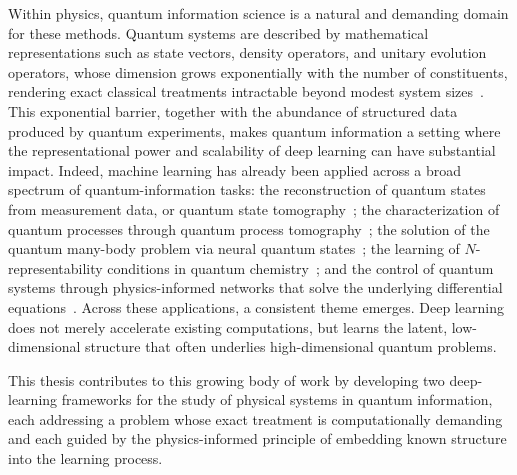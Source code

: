 Within physics, quantum information science is a natural and demanding domain for these methods. Quantum systems are described by mathematical representations such as state vectors, density operators, and unitary evolution operators, whose dimension grows exponentially with the number of constituents, rendering exact classical treatments intractable beyond modest system sizes~\cite{lloyd1996}. This exponential barrier, together with the abundance of structured data produced by quantum experiments, makes quantum information a setting where the representational power and scalability of deep learning can have substantial impact. Indeed, machine learning has already been applied across a broad spectrum of quantum-information tasks: the reconstruction of quantum states from measurement data, or quantum state tomography~\cite{carrasquilla_qst_2019, danaci2021}; the characterization of quantum processes through quantum process tomography~\cite{huang2025}; the solution of the quantum many-body problem via neural quantum states~\cite{carleo2017, carleo2019, huang2022provably, requena2023}; the learning of $N$-representability conditions in quantum chemistry~\cite{sagersmith2022, delgadogranados2025, shao2023}; and the control of quantum systems through physics-informed networks that solve the underlying differential equations~\cite{norambuena2024}. Across these applications, a consistent theme emerges. Deep learning does not merely accelerate existing computations, but learns the latent, low-dimensional structure that often underlies high-dimensional quantum problems.

This thesis contributes to this growing body of work by developing two deep-learning frameworks for the study of physical systems in quantum information, each addressing a problem whose exact treatment is computationally demanding and each guided by the physics-informed principle of embedding known structure into the learning process.

